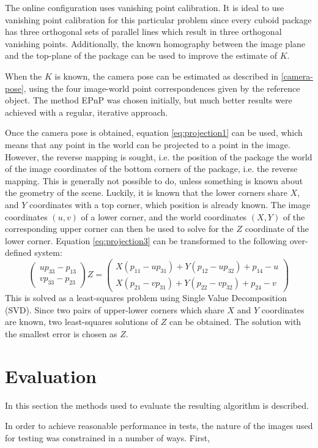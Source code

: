 The online configuration uses vanishing point calibration.
It is ideal to use vanishing point calibration for this particular problem since every cuboid package has three orthogonal sets of parallel lines which result in three orthogonal vanishing points.
Additionally, the known homography between the image plane and the top-plane of the package can be used to improve the estimate of $K$.

When the $K$ is known, the camera pose can be estimated as described in \ref{camera-pose}, using the four image-world point correspondences given by the reference object.
The method EPnP was chosen initially, but much better results were achieved with a regular, iterative approach. %

Once the camera pose is obtained, equation \ref{eq:projection1} can be used, which means that any point in the world can be projected to a point in the image.
However, the reverse mapping is sought, i.e. the position of the package the world of the image coordinates of the bottom corners of the package, i.e. the reverse mapping.
This is generally not possible to do, unless something is known about the geometry of the scene.
Luckily, it is known that the lower corners share $X$, and $Y$ coordinates with a top corner, which position is already known.
The image coordinates $(u,v)$ of a lower corner, and the world coordinates $(X,Y)$ of the corresponding upper corner can then be used to solve for the $Z$ coordinate of the lower corner. 
Equation \ref{eq:projection3} can be transformed to the following over-defined system:
\begin{equation} \label{eq:constrained-projection}
\begin{pmatrix} up_{33}-p_{13} \\ vp_{33}-p_{23} \end{pmatrix} Z = 
\begin{pmatrix}
X(p_{11}-up_{31}) + Y(p_{12}-up_{32})+p_{14}-u \\
X(p_{21}-vp_{31}) + Y(p_{22}-vp_{32})+p_{24}-v
\end{pmatrix}
\end{equation}
This is solved as a least-squares problem using Single Value Decomposition (SVD).
Since two pairs of upper-lower corners which share $X$ and $Y$ coordinates are known, two least-squares solutions of $Z$ can be obtained.
The solution with the smallest error is chosen as $Z$.

\section{Evaluation}
In this section the methods used to evaluate the resulting algorithm is described.

In order to achieve reasonable performance in tests, the nature of the images used for testing was constrained in a number of ways.
First, 
%
%













